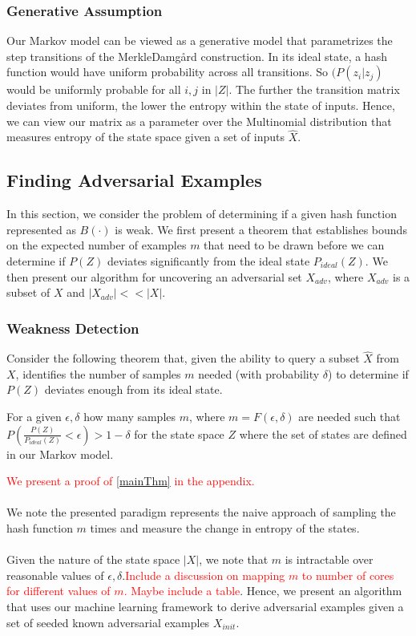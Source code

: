 \subsubsection{Generative Assumption}
Our Markov model can be viewed as a generative model that parametrizes the step transitions of the Merkle{\textendash}Damg\r{a}rd construction. In its ideal state, a hash function would have uniform probability across all transitions. So $(P(z_{i} | z_{j})$ would be uniformly probable for all $i,j$ in $|Z|$. The further the transition matrix deviates from uniform, the lower the entropy within the state of inputs. Hence, we can view our matrix as a parameter over the Multinomial distribution that measures entropy of the state space given a set of inputs $\hat{X}$.



\subsection{Finding Adversarial Examples}
In this section, we consider the problem of determining if a given hash function represented as $B(\cdot)$ is weak. We first present a theorem that establishes bounds on the expected number of examples $m$ that need to be drawn before we can determine if $P(Z)$ deviates significantly from the ideal state $P_{ideal}(Z)$. We then present our algorithm for uncovering an adversarial set $X_{adv}$, where $X_{adv}$ is a subset of $X$ and $|X_{adv}|  << |X|$. 

\subsubsection{Weakness Detection}
Consider the following theorem that, given the ability to query a subset $\hat{X}$ from $X$, identifies the number of samples $m$ needed (with probability $\delta$) to determine if $P(Z)$ deviates enough from its ideal state. 

\begin{theorem}
\label{mainThm}
For a given $\epsilon, \delta$ how many samples $m$, where $m = F(\epsilon, \delta)$ are needed such that $P(\frac{P(Z)}{P_{ideal}(Z)}< \epsilon) > 1 - \delta$ for the state space $Z$ where the set of states are defined in our Markov model. 
\end{theorem}

\textcolor{red}{We present a proof of \ref{mainThm} in the appendix.}
\\
\\
We note the presented paradigm represents the naive approach of sampling the hash function $m$ times and measure the change in entropy of the states. 
\\
\\
Given the nature of the state space $|X|$, we note that $m$ is intractable over reasonable values of $\epsilon, \delta$.\textcolor{red}{Include a discussion on mapping $m$ to number of cores for different values of $m$. Maybe include a table}. Hence, we present an algorithm that uses our machine learning framework to derive adversarial examples given a set of seeded known adversarial examples $X_{init}$. 


